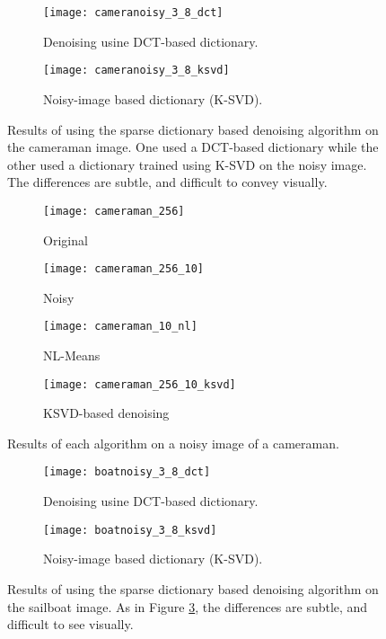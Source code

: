 \documentclass[11pt]{article}
\begin{document}
\begin{figure}
\centering
\graphicspath{{images/}}
\begin{subfigure}[b]{0.4\textwidth}
\centering
\texttt{[image: cameranoisy\_3\_8\_dct]}
\caption{Denoising usine DCT-based dictionary.}
\label{camera:sparse:dct}
\end{subfigure}
\begin{subfigure}[b]{0.4\textwidth}
\centering
\texttt{[image: cameranoisy\_3\_8\_ksvd]}
\caption{Noisy-image based dictionary (K-SVD).}
\label{camera:sparse:ksvd}
\end{subfigure}
\caption{Results of using the sparse dictionary based denoising algorithm on the cameraman image.  One used a DCT-based dictionary while the other used a dictionary trained using K-SVD on the noisy image.  The differences are subtle, and difficult to convey visually.}
\label{fig:cameraman:sparse}
\end{figure}


\begin{figure}
\centering
\graphicspath{{images/}}
\begin{subfigure}[b]{0.4\textwidth}
\centering
\texttt{[image: cameraman\_256]}
\caption{Original}
\label{camera:original}
\end{subfigure}
\begin{subfigure}[b]{0.4\textwidth}
\centering
\texttt{[image: cameraman\_256\_10]}
\caption{Noisy}
\label{camera:noise}
\end{subfigure}
\begin{subfigure}[b]{0.4\textwidth}
\centering
\texttt{[image: cameraman\_10\_nl]}
\caption{NL-Means}
\label{camera:nl}
\end{subfigure}
\begin{subfigure}[b]{0.4\textwidth}
\centering
\texttt{[image: cameraman\_256\_10\_ksvd]}
\caption{KSVD-based denoising}
\label{camera:ksvd}
\end{subfigure}
\caption{Results of each algorithm on a noisy image of a cameraman.}
\label{fig:cameraman:dn}
\end{figure}

\begin{figure}
\centering
\graphicspath{{images/}}
\begin{subfigure}[b]{0.4\textwidth}
\centering
\texttt{[image: boatnoisy\_3\_8\_dct]}
\caption{Denoising usine DCT-based dictionary.}
\label{boat:sparse:dct}
\end{subfigure}
\begin{subfigure}[b]{0.4\textwidth}
\centering
\texttt{[image: boatnoisy\_3\_8\_ksvd]}
\caption{Noisy-image based dictionary (K-SVD).}
\label{boat:sparse:ksvd}
\end{subfigure}
\caption{Results of using the sparse dictionary based denoising algorithm on the sailboat image. As in Figure \ref{fig:cameraman:sparse}, the differences are subtle, and difficult to see visually.}
\label{fig:sailboat:sparse}
\end{figure}
\end{document}
